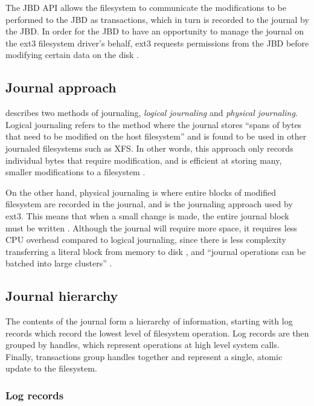 The JBD API allows the filesystem to communicate the modifications to be performed to the JBD as transactions, which in turn is recorded to the journal by the JBD. In order for the JBD to have an opportunity to manage the journal on the ext3 filesystem driver's behalf, ext3 requests permissions from the JBD before modifying certain data on the disk \citep{Robbins2001a}.

\subsection{Journal approach}

\citet[p. 3]{Robbins2001a} describes two methods of journaling, \emph{logical journaling} and \emph{physical journaling}. Logical journaling refers to the method where the journal stores ``spans of bytes that need to be modified on the host filesystem'' and is found to be used in other journaled filesystems such as XFS. In other words, this approach only records individual bytes that require modification, and is efficient at storing many, smaller modifications to a filesystem \citep{Robbins2001a}.

On the other hand, physical journaling is where entire blocks of modified filesystem are recorded in the journal, and is the journaling approach used by ext3. This means that when a small change is made, the entire journal block must be written \citep{Bovet2006, Robbins2001a}. Although the journal will require more space, it requires less CPU overhead compared to logical journaling, since there is less complexity transferring a literal block from memory to disk \citep{Robbins2001a}, and ``journal operations can be batched into large clusters'' \citep[p. 55]{Galli2001}.

\subsection{Journal hierarchy}

The contents of the journal form a hierarchy of information, starting with log records which record the lowest level of filesystem operation. Log records are then grouped by handles, which represent operations at high level system calls. Finally, transactions group handles together and represent a single, atomic update to the filesystem.

\subsubsection{Log records}

